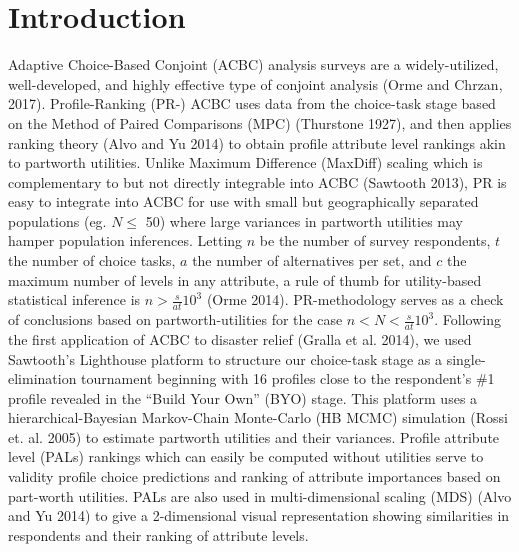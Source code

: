 \documentclass[a4paper, 12pt]{article}
\begin{document}


 \vspace{1in}

\section{Introduction}

Adaptive Choice-Based Conjoint (ACBC) analysis surveys are a widely-utilized, well-developed, and highly effective  type of conjoint analysis (Orme and Chrzan, 2017). Profile-Ranking (PR-) ACBC uses data from the choice-task stage based on  the Method of Paired Comparisons (MPC) (Thurstone 1927),  and then applies ranking theory (Alvo and Yu 2014) to obtain profile attribute level rankings akin to partworth utilities. Unlike Maximum Difference (MaxDiff) scaling which is complementary to but not directly integrable into ACBC  (Sawtooth 2013), PR is easy to integrate into ACBC for use with small but geographically separated populations (eg. $N \le$ 50) where large variances in partworth utilities may hamper population inferences. Letting $n$ be the number of survey respondents, $t$ the number of choice tasks, $a$ the number of alternatives per set, and $c$ the maximum number of levels in any attribute, a rule of thumb for utility-based statistical inference is $n > \frac{s}{at} 10^3$ (Orme 2014). PR-methodology serves as a check of conclusions based on partworth-utilities  for the case $n < N < \frac{s}{at} 10^3$.   Following the first application of ACBC to disaster relief (Gralla et al. 2014), we used Sawtooth's Lighthouse platform to structure our choice-task stage as a single-elimination tournament beginning with 16 profiles close to the respondent's \#1 profile revealed in the  ``Build Your Own'' (BYO) stage. This platform  uses  a hierarchical-Bayesian Markov-Chain Monte-Carlo (HB MCMC) simulation (Rossi et. al. 2005) to estimate partworth utilities and their variances. Profile attribute level (PALs) rankings which can easily be computed without utilities serve to validity profile choice predictions and ranking of attribute importances based on part-worth utilities.  PALs are also used in  multi-dimensional scaling (MDS) (Alvo and Yu 2014) to give a 2-dimensional visual representation showing similarities in respondents and their ranking of attribute levels.
\end{document}
